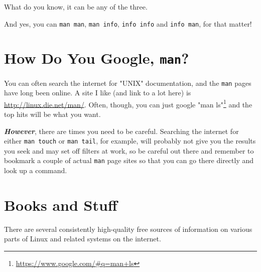 \documentclass[10pt,american,]{book}
\renewcommand{\href}[2]{#2\footnote{\url{#1}}}
\numberwithin{figure}{chapter}
\begin{document}
What do you know, it can be any of the three.

And yes, you can \texttt{man\ man}, \texttt{man\ info},
\texttt{info\ info} and \texttt{info\ man}, for that matter!

\section*{\texorpdfstring{How Do You Google,
\texttt{man}?}{How Do You Google, man?}}\label{how-do-you-google-man}

You can often search the internet for "UNIX" documentation, and the
\texttt{man} pages have long been online. A site I like (and link to a
lot here) is \url{http://linux.die.net/man/}. Often, though, you can
just google \href{https://www.google.com/\#q=man+ls}{"man ls"} and the
top hits will be what you want.

\textbf{\emph{However}}, there are times you need to be careful.
Searching the internet for either \texttt{man\ touch} or
\texttt{man\ tail}, for example, will probably not give you the results
you seek and may set off filters at work, so be careful out there and
remember to bookmark a couple of actual \texttt{man} page sites so that
you can go there directly and look up a command.

\section*{Books and Stuff}\label{books-and-stuff}

There are several consistently high-quality free sources of information
on various parts of Linux and related systems on the internet.
\end{document}
